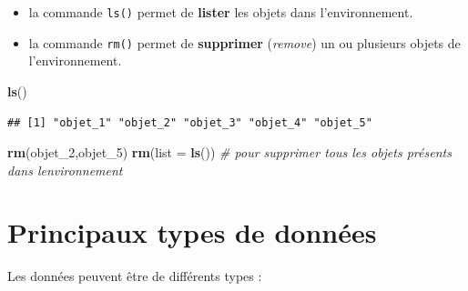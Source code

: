 \documentclass[
]{book}
\newenvironment{Shaded}{\begin{snugshade}}{\end{snugshade}}
\newcommand{\AttributeTok}[1]{\textcolor[rgb]{0.13,0.29,0.53}{#1}}
\newcommand{\CommentTok}[1]{\textcolor[rgb]{0.56,0.35,0.01}{\textit{#1}}}
\newcommand{\FunctionTok}[1]{\textcolor[rgb]{0.13,0.29,0.53}{\textbf{#1}}}
\newcommand{\NormalTok}[1]{#1}
\providecommand{\tightlist}{%
  \setlength{\itemsep}{0pt}\setlength{\parskip}{0pt}}
\begin{document}
\begin{itemize}
\tightlist
\item
  la commande \texttt{ls()} permet de \textbf{lister} les objets dans l'environnement.
\item
  la commande \texttt{rm()} permet de \textbf{supprimer} (\emph{remove}) un ou plusieurs objets de l'environnement.
\end{itemize}

\begin{Shaded}
\begin{Highlighting}[]
\FunctionTok{ls}\NormalTok{()}
\end{Highlighting}
\end{Shaded}

\begin{verbatim}
## [1] "objet_1" "objet_2" "objet_3" "objet_4" "objet_5"
\end{verbatim}

\begin{Shaded}
\begin{Highlighting}[]
\FunctionTok{rm}\NormalTok{(objet\_2,objet\_5)}
\FunctionTok{rm}\NormalTok{(}\AttributeTok{list =} \FunctionTok{ls}\NormalTok{()) }\CommentTok{\# pour supprimer tous les objets présents dans l\textquotesingle{}environnement}
\end{Highlighting}
\end{Shaded}

\section{Principaux types de données}\label{principaux-types-de-donnuxe9es}

Les données peuvent être de différents types :
\end{document}
